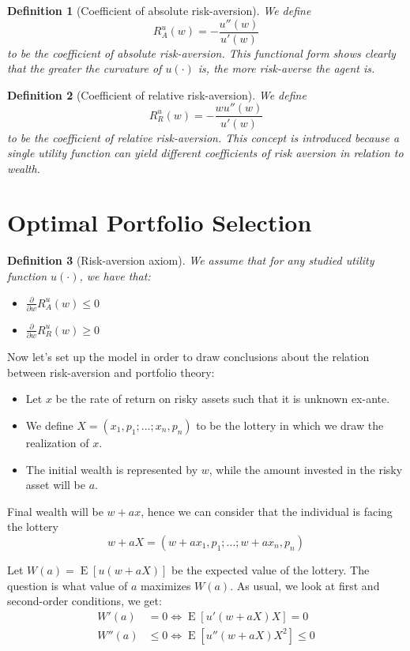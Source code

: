 \documentclass[12pt]{report}
\newtheorem{definition}{Definition}[chapter]
\newcommand{\E}[1]{\operatorname{E}\left[#1\right]}
\begin{document}
\begin{definition}[Coefficient of absolute risk-aversion]
We define $$R_A^u(w) = -\frac{u''(w)}{ u'(w)}$$ to be the coefficient of absolute risk-aversion. This functional form shows clearly that the greater the curvature of $u(\cdot)$ is, the more risk-averse the agent is.
\end{definition}

\begin{definition}[Coefficient of relative risk-aversion]
We define $$ R_R^u(w) = -\frac{wu''(w)}{ u'(w)}$$ to be the coefficient of relative risk-aversion. This concept is introduced because a single utility function can yield different coefficients of risk aversion in relation to wealth.
\end{definition}

\section{Optimal Portfolio Selection}

\begin{definition}[Risk-aversion axiom]
We assume that for any studied utility function $u(\cdot)$, we have that:\begin{itemize}
\item $\frac{\partial }{\partial w}R_A^u(w) \leq 0$
\item $\frac{\partial }{\partial w}R_R^u(w) \geq 0$
\end{itemize}
\end{definition}

Now let's set up the model in order to draw conclusions about the relation between risk-aversion and portfolio theory:\begin{itemize}
\item Let $x$ be the rate of return on risky assets such that it is unknown ex-ante.
\item We define $X = (x_1,p_1 ; ... ; x_n, p_n)$ to be the lottery in which we draw the realization of $x$.
\item The initial wealth is represented by $w$, while the amount invested in the risky asset will be $a$.
\end{itemize} Final wealth will be $w + ax$, hence we can consider that the individual is facing the lottery $$w + aX = (w + ax_1, p_1 ; ... ; w+ax_n, p_n) $$

Let $W(a) = \E{u(w + aX)}$ be the expected value of the lottery. The question is what value of $a$ maximizes $W(a)$. As usual, we look at first and second-order conditions, we get:\begin{align*}
W'(a) & = 0 \Leftrightarrow \E{u'(w+aX)X} = 0 \\
W''(a) &\leq 0 \Leftrightarrow \E{u''(w+aX)X^2} \leq 0
\end{align*}
\end{document}
